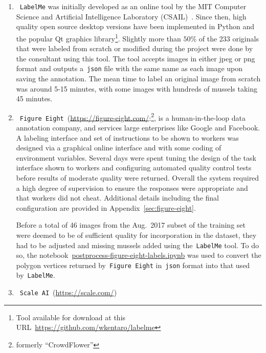 \documentclass[11pt]{article} %
\begin{document}
\begin{enumerate}
\item~\texttt{LabelMe}
was initially developed as an online tool by 
the MIT Computer Science and Artificial Intelligence Laboratory
(CSAIL)~\citep{russell2008labelme}. Since then, high quality open source 
desktop 
versions have been implemented in Python and the popular Qt graphics 
library\footnote{Tool available for download at this 
URL~\url{https://github.com/wkentaro/labelme}}. Slightly more than
$50\%$ of the 233 originals that were labeled from scratch or modified during 
the project were done by the consultant using this tool. The tool accepts 
images in either jpeg or png format and outputs a~\texttt{json} file with the 
same name as each image upon saving the annotation. The mean time to label an 
original image from scratch was around 5-15 minutes, with some images with 
hundreds of mussels taking 45 minutes.

\item~\texttt{Figure Eight}~(\url{https://figure-eight.com/}:\footnote{formerly
``CrowdFlower''}, is a human-in-the-loop data annotation company, and services 
large enterprises like Google and Facebook. A labeling interface and set of
instructions to be shown to workers was designed via a graphical online 
interface and with some coding of environment variables. Several days were
spent tuning the design of the task interface shown to workers and configuring 
automated quality control tests before results of moderate quality were 
returned. Overall the system required a high degree of supervision to ensure
the responses were appropriate and that workers did not cheat. Additional 
details including the final configuration are provided in 
Appendix~\ref{sec:figure-eight}.

Before a total of 46 images from the Aug.~2017 subset of the training set were
deemed to be of sufficient quality for incorporation in the dataset, they had 
to be adjusted and missing mussels added using the~\texttt{LabelMe} tool. To do 
so, the 
notebook~\href{https://github.com/AngusG/cciw-zebra-mussel/blob/master/labelme/figure-eight/postprocess-figure-eight-labels.ipynb}{postprocess-figure-eight-labels.ipynb}
was used to convert the polygon vertices returned by~\texttt{Figure Eight} 
in~\texttt{json} format into that used by~\texttt{LabelMe}.

\item~\texttt{Scale AI}~(\url{https://scale.com/})


\end{enumerate}
\end{document}
